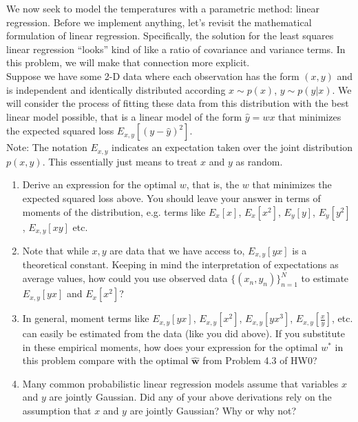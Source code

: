 \documentclass[submit]{../harvardml}
\begin{document}
\newpage
\begin{problem}

We now seek to model the temperatures with a parametric method: linear regression. Before we implement anything, let's revisit the mathematical formulation of linear regression.  Specifically, the solution for the least squares linear regression  ``looks'' kind of like a ratio of covariance and
variance terms.  In this problem, we will make that connection more
explicit. \\

\noindent Suppose we have some 2-D data where each observation has the form $(x, y)$ and is independent and identically distributed according  $x \sim p(x)$, $y \sim p(y|x)$. We will consider the process of fitting these data from this distribution with the best linear model
possible, that is a linear model of the form $\hat{y} = wx$ that
minimizes the expected squared loss $E_{x,y}[ ( y - \hat{y} )^2
    ]$.\\

\noindent Note: The notation $E_{x, y}$ indicates an
expectation taken over the joint distribution $p(x,y)$. This essentially just means to treat $x$ and $y$ as random.  

\begin{enumerate}

  \item Derive an expression for the optimal $w$, that is, the $w$
        that minimizes the expected squared loss above.  You should leave
        your answer in terms of moments of the distribution, e.g. terms
        like $E_x[x]$, $E_x[x^2]$, $E_y[y]$, $E_y[y^2]$, $E_{x,y}[xy]$
        etc.

  \item Note that while $x, y$ are data that we have access to, $E_{x, y}[yx]$ is a theoretical constant. Keeping in mind the interpretation of expectations as average values, how could you use observed data $\{(x_n,y_n)\}_{n=1}^N$ to estimate $E_{x, y}[yx]$ and $E_x[x^2]$?

  \item In general, moment terms like $E_{x, y}[yx]$, $E_{x, y}[x^2]$,
        $E_{x, y}[yx^3]$, $E_{x, y}[\frac{x}{y}]$, etc. can easily be
        estimated from the data (like you did above).  If you substitute in
        these empirical moments, how does your expression for the optimal
        $w^*$ in this problem compare with the optimal $\bm{\hat w}$ from Problem 4.3 of HW0?

  \item Many common probabilistic linear regression models assume that
        variables $x$ and $y$ are jointly Gaussian.  Did any of your above
        derivations rely on the assumption that $x$ and $y$ are jointly
        Gaussian?  Why or why not?
\end{enumerate}
\end{problem}
\end{document}
